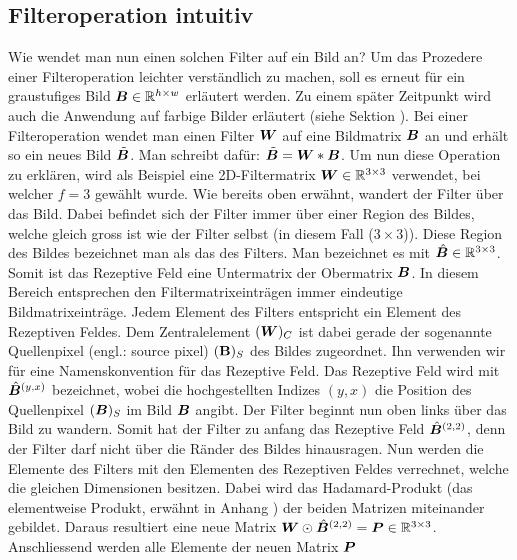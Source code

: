 \subsection{Filteroperation intuitiv}\label{sec:filteroperation_intuitiv}
Wie wendet man nun einen solchen Filter auf ein Bild an? Um das Prozedere einer
Filteroperation leichter verständlich zu machen, soll es erneut für ein
graustufiges Bild $\bm{B} \in \mathbb{R}^{h \times w}$ erläutert werden. Zu einem
später Zeitpunkt wird auch die Anwendung auf farbige
Bilder erläutert (siehe Sektion ).
\para{}
Bei einer Filteroperation wendet man einen Filter $\bm{W}$ auf eine Bildmatrix
$\bm{B}$ an und erhält so ein neues Bild $\tilde{\bm{B}}$. Man schreibt dafür:
$\tilde{\bm{B}} = \bm{W} * \bm{B}$.
\para{}
Um nun diese Operation zu erklären, wird als Beispiel eine
2D-Filtermatrix $\bm{W} \in \mathbb{R}^{3 \times 3}$ verwendet, bei welcher
$f = 3$ gewählt wurde.
Wie bereits oben erwähnt, wandert der Filter über das Bild. Dabei befindet
sich der Filter immer über einer Region des Bildes, welche gleich gross ist
wie der Filter selbst (in diesem Fall ($3 \times 3$)). Diese Region des Bildes
bezeichnet man als das  des Filters. Man bezeichnet es mit $\hat{\bm{B}}
\in \mathbb{R}^{3 \times 3}$. Somit ist das Rezeptive Feld eine Untermatrix der Obermatrix $\bm{B}$.
\para{}
In diesem Bereich entsprechen den Filtermatrixeinträgen immer eindeutige Bildmatrixeinträge.
Jedem Element des Filters entspricht ein Element des Rezeptiven Feldes. Dem
Zentralelement $(\bm{W})_C$ ist dabei gerade der sogenannte Quellenpixel
(engl.: source pixel) $(\mathbf{B})_S$ des Bildes zugeordnet. Ihn verwenden wir für eine
Namenskonvention für das Rezeptive Feld. Das Rezeptive Feld wird mit
$\hat{\bm{B}}^{(y,x)}$ bezeichnet, wobei die hochgestellten Indizes $(y,x)$ die Position
des Quellenpixel $(\bm{B})_S$ im Bild $\bm{B}$ angibt.
\para{}
Der Filter beginnt nun oben links über das Bild zu wandern. Somit
hat der Filter zu anfang das Rezeptive Feld $\hat{\bm{B}}^{(2,2)}$, denn der
Filter darf nicht über die Ränder des Bildes hinausragen.
Nun werden die Elemente des Filters mit den Elementen des Rezeptiven Feldes
verrechnet, welche die gleichen Dimensionen besitzen. Dabei wird das
Hadamard-Produkt (das elementweise Produkt, erwähnt in Anhang ) der beiden Matrizen miteinander
gebildet. Daraus resultiert eine neue Matrix $\bm{W} \odot
\hat{\bm{B}}^{(2,2)} = \bm{P} \in \mathbb{R}^{3 \times 3}$.
Anschliessend werden alle Elemente der neuen Matrix $\bm{P}$
